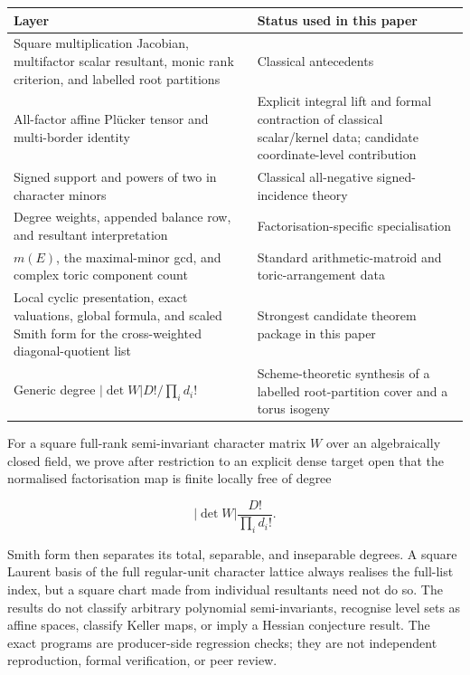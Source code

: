 \documentclass[
  11pt,
  a4paper,
]{article}
\newcounter{none} %
\begin{document}
{\def\LTcaptype{none} %
\begin{longtable}[]{@{}
  >{\raggedright\arraybackslash}p{}
  >{\raggedright\arraybackslash}p{}@{}}
\toprule\noalign{}
\begin{minipage}[b]{\linewidth}\raggedright
Layer
\end{minipage} & \begin{minipage}[b]{\linewidth}\raggedright
Status used in this paper
\end{minipage} \\
\midrule\noalign{}
\endhead
\bottomrule\noalign{}
\endlastfoot
Square multiplication Jacobian, multifactor scalar resultant, monic rank
criterion, and labelled root partitions & Classical antecedents \\
All-factor affine Plücker tensor and multi-border identity & Explicit
integral lift and formal contraction of classical scalar/kernel data;
candidate coordinate-level contribution \\
Signed support and powers of two in character minors & Classical
all-negative signed-incidence theory \\
Degree weights, appended balance row, and resultant interpretation &
Factorisation-specific specialisation \\
\(m(E)\), the maximal-minor gcd, and complex toric component count &
Standard arithmetic-matroid and toric-arrangement data \\
Local cyclic presentation, exact valuations, global formula, and scaled
Smith form for the cross-weighted diagonal-quotient list & Strongest
candidate theorem package in this paper \\
Generic degree \(|\det W|D!/\prod_i d_i!\) & Scheme-theoretic synthesis
of a labelled root-partition cover and a torus isogeny \\
\end{longtable}
}

For a square full-rank semi-invariant character matrix \(W\) over an
algebraically closed field, we prove after restriction to an explicit
dense target open that the normalised factorisation map is finite
locally free of degree

\[
 |\det W|\frac{D!}{\prod_i d_i!}.
\]

Smith form then separates its total, separable, and inseparable degrees.
A square Laurent basis of the full regular-unit character lattice always
realises the full-list index, but a square chart made from individual
resultants need not do so. The results do not classify arbitrary
polynomial semi-invariants, recognise level sets as affine spaces,
classify Keller maps, or imply a Hessian conjecture result. The exact
programs are producer-side regression checks; they are not independent
reproduction, formal verification, or peer review.
\end{document}
